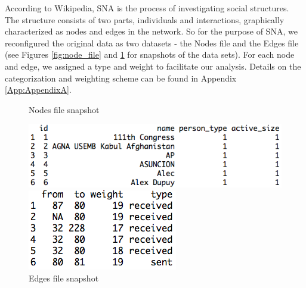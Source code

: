 
According to Wikipedia, SNA  is the process of investigating social structures\cite{wiki_sna}. The structure consists of two parts, individuals and interactions, graphically characterized as nodes and edges in the network. So for the purpose of SNA, we reconfigured the original data as two datasets - the Nodes file and the Edges file (see Figures \ref{fig:node_file} and \ref{fig:edge_file} for snapshots of the data sets). For each node and edge, we assigned a type and weight to facilitate our analysis. Details on the categorization and weighting scheme can be found in Appendix \ref{App:AppendixA}.
\begin{figure}[ht]
\caption{Nodes file snapshot}
\label{fig:node_file}
\centering
\includegraphics[width=.68\textwidth]{zoe/report_node_file}

\caption{Edges file snapshot}
\label{fig:edge_file}
\centering
\includegraphics[width=.35\textwidth]{zoe/report_edge_file}
\end{figure}
